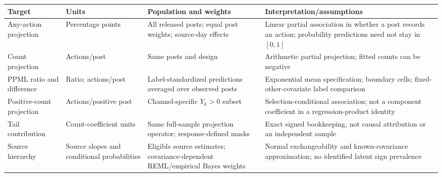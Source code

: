\begin{tabularx}{\textwidth}{>{\raggedright\arraybackslash}p{23mm}>{\raggedright\arraybackslash}p{27mm}>{\raggedright\arraybackslash}X>{\raggedright\arraybackslash}X}
\toprule
Target & Units & Population and weights & Interpretation/assumptions \\
\midrule
Any-action projection & Percentage points & All released posts; equal post weights; source-day effects & Linear partial association in whether a post records an action; probability predictions need not stay in $[0,1]$ \\
Count projection & Actions/post & Same posts and design & Arithmetic partial projection; fitted counts can be negative \\
PPML ratio and difference & Ratio; actions/post & Label-standardized predictions averaged over observed posts & Exponential mean specification; boundary cells; fixed-other-covariate label comparison \\
Positive-count projection & Actions/positive post & Channel-specific $Y_k>0$ subset & Selection-conditional association; not a component coefficient in a regression-product identity \\
Tail contribution & Count-coefficient units & Same full-sample projection operator; response-defined masks & Exact signed bookkeeping, not causal attribution or an independent sample \\
Source hierarchy & Source slopes and conditional probabilities & Eligible source estimates; covariance-dependent REML/empirical Bayes weights & Normal exchangeability and known-covariance approximation; no identified latent sign prevalence \\
\bottomrule
\end{tabularx}
